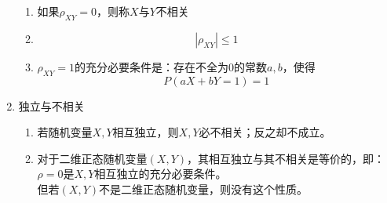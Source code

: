 \begin{enumerate}
\begin{enumerate}
		\item 如果$\rho_{XY}=0$，则称$X$与$Y$不相关

		\item 
		\begin{equation}
			\left|\rho_{XY}\right| \leq 1
		\end{equation}
		\item $\rho_{XY} = 1$的充分必要条件是：存在不全为$0$的常数$a,b$，使得
		\begin{equation}
			P(aX+bY=1) = 1
		\end{equation}
	\end{enumerate}

	\item 独立与不相关
	\begin{enumerate}
		\item 若随机变量$X,Y$相互独立，则$X,Y$必不相关；反之却不成立。
		\item 对于二维正态随机变量$(X,Y)$，其相互独立与其不相关是等价的，即：$\rho=0$是$X,Y$相互独立的充分必要条件。\\
		但若$(X,Y)$不是二维正态随机变量，则没有这个性质。
	\end{enumerate}
	

\end{enumerate}

















